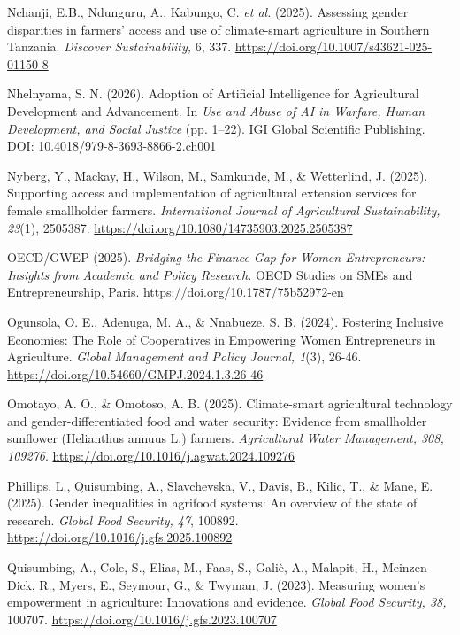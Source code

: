 ﻿\documentclass[sn-mathphys-num]{sn-jnl}
\newcommand{\hl}[1]{#1}
\begin{document}
\hl{Nchanji, E.B., Ndunguru, A., Kabungo, C. \emph{et al.} (2025).
Assessing gender disparities in farmers' access and use of climate-smart
agriculture in Southern Tanzania. \emph{Discover Sustainability,} 6,
337.}
\href{https://doi.org/10.1007/s43621-025-01150-8}{\hl{https://doi.org/10.1007/s43621-025-01150-8}}

\hl{Nhelnyama, S. N. (2026). Adoption of Artificial Intelligence for
Agricultural Development and Advancement. In \emph{Use and Abuse of AI
in Warfare, Human Development, and Social Justice} (pp. 1--22). IGI
Global Scientific Publishing. DOI: 10.4018/979-8-3693-8866-2.ch001}

\hl{Nyberg, Y., Mackay, H., Wilson, M., Samkunde, M., \& Wetterlind, J.
(2025). Supporting access and implementation of agricultural extension
services for female smallholder farmers. \emph{International Journal of
Agricultural Sustainability, 23}(1), 2505387.}
\href{https://doi.org/10.1080/14735903.2025.2505387}{\hl{https://doi.org/10.1080/14735903.2025.2505387}}

\hl{OECD/GWEP (2025). \emph{Bridging the Finance Gap for Women
Entrepreneurs: Insights from Academic and Policy Research.} OECD Studies
on SMEs and Entrepreneurship, Paris.}
\href{https://doi.org/10.1787/75b52972-en}{\hl{https://doi.org/10.1787/75b52972-en}}

\hl{Ogunsola, O. E., Adenuga, M. A., \& Nnabueze, S. B. (2024).
Fostering Inclusive Economies: The Role of Cooperatives in Empowering
Women Entrepreneurs in Agriculture. \emph{Global Management and Policy
Journal, 1}(3), 26-46.}
\href{https://doi.org/10.54660/GMPJ.2024.1.3.26-46}{\hl{https://doi.org/10.54660/GMPJ.2024.1.3.26-46}}

\hl{Omotayo, A. O., \& Omotoso, A. B. (2025). Climate-smart agricultural
technology and gender-differentiated food and water security: Evidence
from smallholder sunflower (Helianthus annuus L.) farmers.
\emph{Agricultural Water Management, 308, 109276}.}
\href{https://doi.org/10.1016/j.agwat.2024.109276}{\hl{https://doi.org/10.1016/j.agwat.2024.109276}}

\hl{Phillips, L., Quisumbing, A., Slavchevska, V., Davis, B., Kilic, T.,
\& Mane, E. (2025). Gender inequalities in agrifood systems: An overview
of the state of research. \emph{Global Food Security, 47}, 100892.}
\href{https://doi.org/10.1016/j.gfs.2025.100892}{\hl{https://doi.org/10.1016/j.gfs.2025.100892}}

\hl{Quisumbing, A., Cole, S., Elias, M., Faas, S., Galiè, A., Malapit,
H., Meinzen-Dick, R., Myers, E., Seymour, G., \& Twyman, J. (2023).
Measuring women's empowerment in agriculture: Innovations and evidence.
\emph{Global Food Security, 38,} 100707.}
\href{https://doi.org/10.1016/j.gfs.2023.100707}{\hl{https://doi.org/10.1016/j.gfs.2023.100707}}
\end{document}
